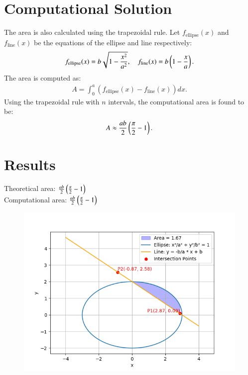 \documentclass[journal]{IEEEtran}
\begin{document}
\section*{Computational Solution}
The area is also calculated using the trapezoidal rule. Let $f_{\text{ellipse}}(x)$ and $f_{\text{line}}(x)$ be the equations of the ellipse and line respectively:
\begin{align}
f_{\text{ellipse}}(x) = b\sqrt{1 - \frac{x^2}{a^2}}, \quad f_{\text{line}}(x) = b\left(1 - \frac{x}{a}\right).
\end{align}
The area is computed as:
\begin{align}
A = \int_{0}^{a} \left(f_{\text{ellipse}}(x) - f_{\text{line}}(x)\right) dx.
\end{align}
Using the trapezoidal rule with $n$ intervals, the computational area is found to be:
\begin{align}
A \approx \frac{ab}{2} \left(\frac{\pi}{2} - 1\right).
\end{align}

\section*{Results}
Theoretical area: $\frac{ab}{2}\left(\frac{\pi}{2} - 1\right)$ \\
Computational area: $\frac{ab}{2}\left(\frac{\pi}{2} - 1\right)$

\begin{figure}[h!]
   \centering
   \includegraphics[width=1\linewidth]{figs/fig.png}
  
   \label{stemplot}
\end{figure}
\end{document}
